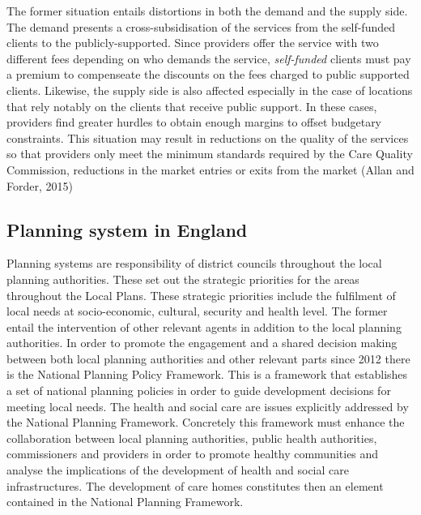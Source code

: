 \documentclass[12pt,letterpaper]{article}
\begin{document}
The former situation entails distortions in both the demand and the supply side. 
The demand presents a cross-subsidisation of the services from the self-funded 
clients to the publicly-supported. Since providers offer the service with two 
different fees depending on who demands the service, {\it self-funded} clients 
must pay a premium to compenseate the discounts on the fees charged to public 
supported clients. Likewise, the supply side is also affected especially in the 
case of locations that rely notably on the clients that receive public support. In these cases, 
providers find greater hurdles to obtain enough margins to offset budgetary 
constraints. This situation may result in reductions on the
   quality of the services so that providers only meet the minimum standards required by the Care Quality
    Commission, reductions in the market entries or exits from the market (Allan and Forder, 2015)
    
  \subsection{Planning system in England}
  \label{sec: planning}
  
 Planning systems are responsibility of district councils throughout the local planning authorities. 
 These set out the strategic priorities for the areas throughout the Local Plans.
  These strategic priorities include the fulfilment of local needs at socio-economic, 
  cultural, security and health level. The former entail the intervention of other relevant agents
   in addition to the local planning authorities. In order to promote the engagement and a shared 
   decision making between both local planning authorities and other relevant parts since 2012 
   there is the National Planning Policy Framework. This is a framework that establishes a set of
    national planning policies in order to guide development decisions for meeting local needs. 
    The health and social care are issues explicitly addressed by the National Planning Framework.
     Concretely this framework must enhance the collaboration between local planning authorities, 
     public health authorities, commissioners and providers in order to promote healthy communities 
     and analyse the implications of the development of health and social care infrastructures. 
     The development of care homes constitutes then an element contained in the National Planning
      Framework. 
      
\end{document}
